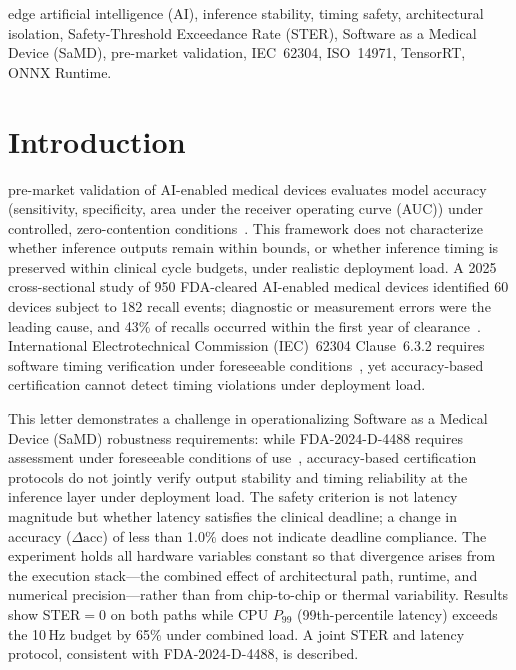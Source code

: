 \documentclass[journal,twoside,9pt]{IEEEtran}
\begin{document}
\begin{IEEEkeywords}
edge artificial intelligence (AI), inference stability, timing safety, architectural
isolation, Safety-Threshold Exceedance Rate (STER), Software as a Medical Device
(SaMD), pre-market validation, IEC~62304, ISO~14971, TensorRT, ONNX Runtime.
\end{IEEEkeywords}

\section{Introduction}

 pre-market validation of AI-enabled medical devices evaluates
model accuracy (sensitivity, specificity, area under the receiver operating curve (AUC))
under controlled, zero-contention conditions~\cite{fda2025}. This framework does not
characterize whether inference outputs remain within bounds, or whether inference
timing is preserved within clinical cycle budgets, under realistic deployment load.
A 2025 cross-sectional study of 950 FDA-cleared AI-enabled medical devices identified
60 devices subject to 182 recall events; diagnostic or measurement errors were the
leading cause, and 43\% of recalls occurred within the first year of
clearance~\cite{lee2025}.
International Electrotechnical Commission (IEC)~62304 Clause~6.3.2 requires software
timing verification under foreseeable conditions~\cite{iec62304}, yet accuracy-based
certification cannot detect timing violations under deployment load.

This letter demonstrates a challenge in operationalizing Software as a Medical
Device (SaMD) robustness requirements: while FDA-2024-D-4488 requires assessment
under foreseeable conditions of use~\cite{fda2025}, accuracy-based certification
protocols do not jointly verify output stability and timing reliability at the
inference layer under deployment load. The safety criterion
is not latency magnitude but whether latency satisfies the clinical deadline; a change
in accuracy ($\Delta\text{acc}$) of less than 1.0\% does not indicate deadline
compliance. The experiment holds all hardware variables constant so that divergence arises from
the execution stack---the combined effect of architectural path, runtime, and
numerical precision---rather than from chip-to-chip or thermal variability. Results show STER$=0$ on both paths while CPU
$P_{99}$ (99th-percentile latency) exceeds the 10\,Hz budget by 65\% under combined
load. A joint STER and latency protocol, consistent with FDA-2024-D-4488, is described.
\end{document}
